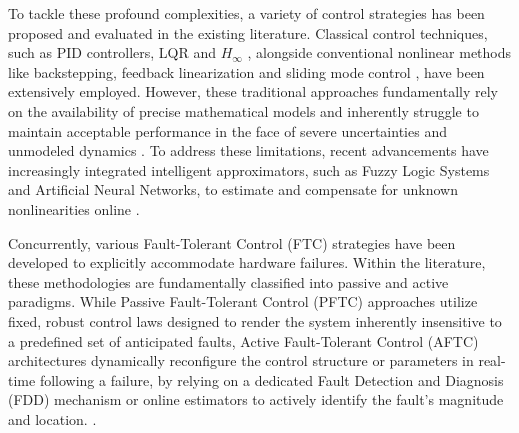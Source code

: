 To tackle these profound complexities, a variety of control strategies has been proposed and evaluated in the existing literature. Classical control techniques, such as PID controllers, LQR and $H_{\infty}$ \cite{trmspid, trmsHinf}, alongside conventional nonlinear methods like backstepping, feedback linearization and sliding mode control \cite{trms_smc,trms_bsc, trmsFeedbackL}, have been extensively employed. However, these traditional approaches fundamentally rely on the availability of precise mathematical models and inherently struggle to maintain acceptable performance in the face of severe uncertainties and unmodeled dynamics \cite{control_methods}. To address these limitations, recent advancements have increasingly integrated intelligent approximators, such as Fuzzy Logic Systems and Artificial Neural Networks, to estimate and compensate for unknown nonlinearities online \cite{trmsFuzzyFault, rbfnn2, NN_Control_Ref}. 

Concurrently, various Fault-Tolerant Control (FTC) strategies have been developed to explicitly accommodate hardware failures. Within the literature, these methodologies are fundamentally classified into passive and active paradigms. While  Passive Fault-Tolerant Control (PFTC) approaches utilize fixed, robust control laws designed to render the system inherently insensitive to a predefined set of anticipated faults, Active Fault-Tolerant Control (AFTC) architectures dynamically reconfigure the control structure or parameters in real-time following a failure, by relying on a dedicated Fault Detection and Diagnosis (FDD) mechanism or online estimators to actively identify the fault's magnitude and location. \cite{ftc1, Zhang2013f, fault}. 

